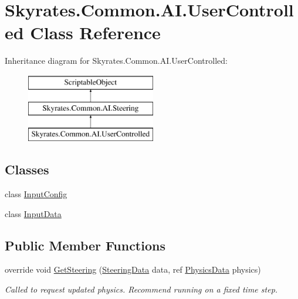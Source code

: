 \hypertarget{class_skyrates_1_1_common_1_1_a_i_1_1_user_controlled}{\section{Skyrates.\-Common.\-A\-I.\-User\-Controlled Class Reference}
\label{class_skyrates_1_1_common_1_1_a_i_1_1_user_controlled}
}
Inheritance diagram for Skyrates.\-Common.\-A\-I.\-User\-Controlled\-:\begin{figure}[H]
\begin{center}
\leavevmode
\includegraphics[height=3.000000cm]{class_skyrates_1_1_common_1_1_a_i_1_1_user_controlled}
\end{center}
\end{figure}
\subsection*{Classes}
\begin{DoxyCompactItemize}
\item 
class \hyperlink{class_skyrates_1_1_common_1_1_a_i_1_1_user_controlled_1_1_input_config}{Input\-Config}
\item 
class \hyperlink{class_skyrates_1_1_common_1_1_a_i_1_1_user_controlled_1_1_input_data}{Input\-Data}
\end{DoxyCompactItemize}
\subsection*{Public Member Functions}
\begin{DoxyCompactItemize}
\item 
override void \hyperlink{class_skyrates_1_1_common_1_1_a_i_1_1_user_controlled_a449f762839eccc1e7e870ddd6cbbc61c}{Get\-Steering} (\hyperlink{class_skyrates_1_1_common_1_1_a_i_1_1_steering_data}{Steering\-Data} data, ref \hyperlink{class_skyrates_1_1_common_1_1_a_i_1_1_physics_data}{Physics\-Data} physics)
\begin{DoxyCompactList}\small\item\em Called to request updated physics. Recommend running on a fixed time step. \end{DoxyCompactList}\end{DoxyCompactItemize}
